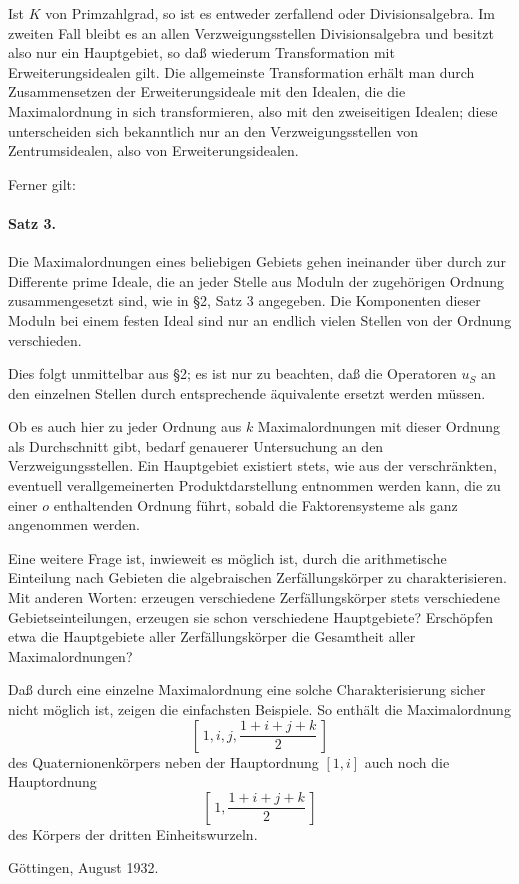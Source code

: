 \documentclass[11pt]{article}
\begin{document}
Ist \(K\) von Primzahlgrad, so ist es entweder zerfallend oder Divisionsalgebra. Im zweiten Fall bleibt es an allen Verzweigungsstellen Divisionsalgebra und besitzt also nur ein Hauptgebiet, so daß wiederum Transformation mit Erweiterungsidealen gilt. Die allgemeinste Transformation erhält man durch Zusammensetzen der Erweiterungsideale mit den Idealen, die die Maximalordnung in sich transformieren, also mit den zweiseitigen Idealen; diese unterscheiden sich bekanntlich nur an den Verzweigungsstellen von Zentrumsidealen, also von Erweiterungsidealen.

Ferner gilt:

\paragraph{Satz 3.}
Die Maximalordnungen eines beliebigen Gebiets gehen ineinander über durch zur Differente prime Ideale, die an jeder Stelle aus Moduln der zugehörigen Ordnung zusammengesetzt sind, wie in §2, Satz 3 angegeben. Die Komponenten dieser Moduln bei einem festen Ideal sind nur an endlich vielen Stellen von der Ordnung verschieden.

Dies folgt unmittelbar aus §2; es ist nur zu beachten, daß die Operatoren \(u_S\) an den einzelnen Stellen durch entsprechende äquivalente ersetzt werden müssen.

Ob es auch hier zu jeder Ordnung aus \(k\) Maximalordnungen mit dieser Ordnung als Durchschnitt gibt, bedarf genauerer Untersuchung an den Verzweigungsstellen. Ein Hauptgebiet existiert stets, wie aus der verschränkten, eventuell verallgemeinerten Produktdarstellung entnommen werden kann, die zu einer \(o\) enthaltenden Ordnung führt, sobald die Faktorensysteme als ganz angenommen werden.

Eine weitere Frage ist, inwieweit es möglich ist, durch die arithmetische Einteilung nach Gebieten die algebraischen Zerfällungskörper zu charakterisieren. Mit anderen Worten: erzeugen verschiedene Zerfällungskörper stets verschiedene Gebietseinteilungen, erzeugen sie schon verschiedene Hauptgebiete? Erschöpfen etwa die Hauptgebiete aller Zerfällungskörper die Gesamtheit aller Maximalordnungen?

Daß durch eine einzelne Maximalordnung eine solche Charakterisierung sicher nicht möglich ist, zeigen die einfachsten Beispiele. So enthält die Maximalordnung
\[
        \left[\,1,i,j,\frac{1+i+j+k}{2}\,\right]
\]
des Quaternionenkörpers neben der Hauptordnung \([1,i]\) auch noch die Hauptordnung
\[
        \left[\,1,\frac{1+i+j+k}{2}\,\right]
\]
des Körpers der dritten Einheitswurzeln.

\begin{center}
Göttingen, August 1932.
\end{center}
\end{document}

